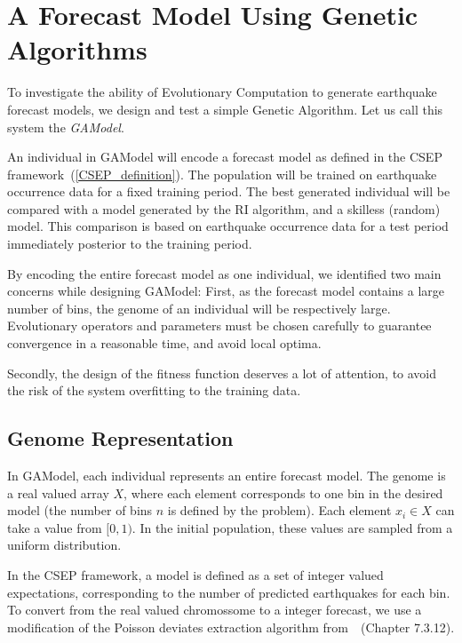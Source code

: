 \documentclass{sig-alternate}
\begin{document}
\section{A Forecast Model Using Genetic Algorithms} 

To investigate the ability of Evolutionary Computation to generate
earthquake forecast models, we design and test a simple Genetic
Algorithm. Let us call this system the \emph{GAModel}.

An individual in GAModel will encode a forecast model as defined in
the CSEP framework~(\ref{CSEP_definition}). The population will be
trained on earthquake occurrence data for a fixed training period. The
best generated individual will be compared with a model generated by
the RI algorithm, and a skilless (random) model. This comparison is
based on earthquake occurrence data for a test period immediately
posterior to the training period.

By encoding the entire forecast model as one individual, we identified
two main concerns while designing GAModel: First, as the forecast
model contains a large number of bins, the genome of an individual
will be respectively large. Evolutionary operators and parameters must
be chosen carefully to guarantee convergence in a reasonable time, and
avoid local optima.

Secondly, the design of the fitness function deserves a lot of
attention, to avoid the risk of the system overfitting to the training
data.

\subsection{Genome Representation}

In GAModel, each individual represents an entire forecast model. The
genome is a real valued array $X$, where each element corresponds to
one bin in the desired model (the number of bins $n$ is defined by the
problem). Each element $x_i \in X$ can take a value from $[0,1)$. In
  the initial population, these values are sampled from a uniform
  distribution.

In the CSEP framework, a model is defined as a set of integer valued
expectations, corresponding to the number of predicted earthquakes for
each bin. To convert from the real valued chromossome to a integer
forecast, we use a modification of the Poisson deviates extraction
algorithm from~\cite{NumericalRecipes}~(Chapter 7.3.12).
\end{document}
